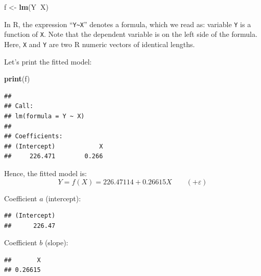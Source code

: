\documentclass[10pt,b5paper,krantz1]{krantz}
\newenvironment{Shaded}{\begin{snugshade}}{\end{snugshade}}
\newcommand{\DecValTok}[1]{\textcolor[rgb]{0.06,0.06,0.06}{#1}}
\newcommand{\KeywordTok}[1]{\textcolor[rgb]{0.27,0.27,0.27}{\textbf{#1}}}
\newcommand{\NormalTok}[1]{#1}
\newcommand{\OperatorTok}[1]{\textcolor[rgb]{0.43,0.43,0.43}{\textbf{#1}}}
\newcommand{\StringTok}[1]{\textcolor[rgb]{0.5,0.5,0.5}{#1}}
\begin{document}
\begin{Shaded}
\begin{Highlighting}[]
\NormalTok{f <-}\StringTok{ }\KeywordTok{lm}\NormalTok{(Y}\OperatorTok{~}\NormalTok{X)}
\end{Highlighting}
\end{Shaded}

In R, the expression ``\texttt{Y\textasciitilde{}X}'' denotes a formula, which we read as:
variable \texttt{Y} is a function of \texttt{X}.
Note that the dependent variable is on the left side of the formula.
Here, \texttt{X} and \texttt{Y} are two R numeric vectors of identical lengths.

Let's print the fitted model:

\begin{Shaded}
\begin{Highlighting}[]
\KeywordTok{print}\NormalTok{(f)}
\end{Highlighting}
\end{Shaded}

\begin{verbatim}
## 
## Call:
## lm(formula = Y ~ X)
## 
## Coefficients:
## (Intercept)            X  
##     226.471        0.266
\end{verbatim}

Hence, the fitted model is:
\[
Y = f(X) = 226.47114+0.26615 X
\qquad (+ \varepsilon)
\]

Coefficient \(a\) (intercept):

\begin{Shaded}
\end{Shaded}

\begin{verbatim}
## (Intercept) 
##      226.47
\end{verbatim}

Coefficient \(b\) (slope):

\begin{Shaded}
\end{Shaded}

\begin{verbatim}
##       X 
## 0.26615
\end{verbatim}
\end{document}
